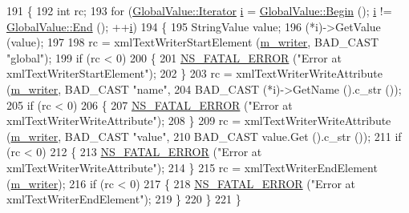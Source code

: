 \begin{DoxyCode}
191 \{
192   \textcolor{keywordtype}{int} rc;
193   \textcolor{keywordflow}{for} (\hyperlink{classns3_1_1GlobalValue_a1bb2cbb186e3759817095c9a5f5f544e}{GlobalValue::Iterator} \hyperlink{bernuolliDistribution_8m_a6f6ccfcf58b31cb6412107d9d5281426}{i} = \hyperlink{classns3_1_1GlobalValue_acdeb71b28fe45d98523a2168e8807d83}{GlobalValue::Begin} (); 
      \hyperlink{bernuolliDistribution_8m_a6f6ccfcf58b31cb6412107d9d5281426}{i} != \hyperlink{classns3_1_1GlobalValue_a2488c329999cf507cc7f7aeb173a4a75}{GlobalValue::End} (); ++\hyperlink{bernuolliDistribution_8m_a6f6ccfcf58b31cb6412107d9d5281426}{i})
194     \{
195       StringValue value;
196       (*i)->GetValue (value);
197 
198       rc = xmlTextWriterStartElement (\hyperlink{classns3_1_1XmlConfigSave_a838ec47c15d124d23133a8e633c40397}{m\_writer}, BAD\_CAST \textcolor{stringliteral}{"global"});
199       \textcolor{keywordflow}{if} (rc < 0)
200         \{
201           \hyperlink{group__fatal_ga5131d5e3f75d7d4cbfd706ac456fdc85}{NS\_FATAL\_ERROR} (\textcolor{stringliteral}{"Error at xmlTextWriterStartElement"});
202         \}
203       rc = xmlTextWriterWriteAttribute (\hyperlink{classns3_1_1XmlConfigSave_a838ec47c15d124d23133a8e633c40397}{m\_writer}, BAD\_CAST \textcolor{stringliteral}{"name"},
204                                         BAD\_CAST (*i)->GetName ().c\_str ());
205       \textcolor{keywordflow}{if} (rc < 0)
206         \{
207           \hyperlink{group__fatal_ga5131d5e3f75d7d4cbfd706ac456fdc85}{NS\_FATAL\_ERROR} (\textcolor{stringliteral}{"Error at xmlTextWriterWriteAttribute"});
208         \}
209       rc = xmlTextWriterWriteAttribute (\hyperlink{classns3_1_1XmlConfigSave_a838ec47c15d124d23133a8e633c40397}{m\_writer}, BAD\_CAST \textcolor{stringliteral}{"value"},
210                                         BAD\_CAST value.Get ().c\_str ());
211       \textcolor{keywordflow}{if} (rc < 0)
212         \{
213           \hyperlink{group__fatal_ga5131d5e3f75d7d4cbfd706ac456fdc85}{NS\_FATAL\_ERROR} (\textcolor{stringliteral}{"Error at xmlTextWriterWriteAttribute"});
214         \}
215       rc = xmlTextWriterEndElement (\hyperlink{classns3_1_1XmlConfigSave_a838ec47c15d124d23133a8e633c40397}{m\_writer});
216       \textcolor{keywordflow}{if} (rc < 0)
217         \{
218           \hyperlink{group__fatal_ga5131d5e3f75d7d4cbfd706ac456fdc85}{NS\_FATAL\_ERROR} (\textcolor{stringliteral}{"Error at xmlTextWriterEndElement"});
219         \}
220     \}
221 \}
\end{DoxyCode}


